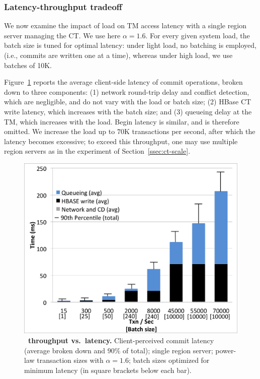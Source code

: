 \subsubsection{Latency-throughput tradeoff} 
\label{ssec:latency}

We now examine the impact of load on  TM access latency with a single region server managing the CT. We use here $\alpha= 1.6$. 
For every given system load, the batch size is tuned for optimal latency:
under light load, no batching is employed, (i.e., commits are written one at a time), whereas
under high load, we use batches of 10K. 

Figure~\ref{fig:omid_latency} reports the average
client-side latency of commit operations, 
broken down to three components: (1) network round-trip delay and conflict detection, which are negligible, and 
do not vary with the load or batch size;
(2) HBase CT write latency, which increases with the batch size; and (3) queueing delay at the TM, which increases with the load.
Begin latency is similar, and is therefore omitted.
We increase the load up to $70$K transactions per second, after which the latency becomes excessive; 
to exceed this throughput, one may use multiple region servers as in the experiment of Section~\ref{ssec:ct-scale}. 

\begin{figure}[h!]
\centerline{
\includegraphics[width=0.975\columnwidth]{Latency-Omid.png}
}
\caption{{\bf \sys\ throughput vs.\ latency.} Client-perceived commit latency (average broken down and $90\%$ of total); single region server; power-law transaction sizes  with $\alpha=1.6$; batch sizes optimized for minimum latency (in square brackets below each bar).
}
\label{fig:omid_latency}
\end{figure}

